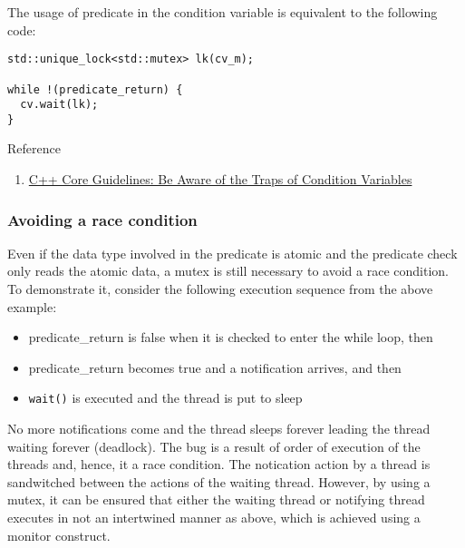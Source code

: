 \documentclass{scrartcl}
\begin{document}
The usage of predicate in the condition variable is equivalent to the following code:

\begin{verbatim}
std::unique_lock<std::mutex> lk(cv_m);

while !(predicate_return) {
  cv.wait(lk);
}
\end{verbatim}


Reference
\begin{enumerate}
\item \href{https://www.modernescpp.com/index.php/c-core-guidelines-be-aware-of-the-traps-of-condition-variables}{C++ Core Guidelines: Be Aware of the Traps of Condition Variables}
\end{enumerate}

\subsubsection{Avoiding a race condition}
Even if the data type involved in the predicate is atomic and the predicate check only reads the atomic data, a mutex is still necessary to avoid a race condition. To demonstrate it, consider the following execution sequence from the above example:
\begin{itemize}
    \item predicate\_return is false when it is checked to enter the while loop, then
    \item predicate\_return becomes true and a notification arrives, and then
    \item \texttt{wait()} is executed and the thread is put to sleep
\end{itemize}

No more notifications come and the thread sleeps forever leading the thread waiting forever (deadlock). The bug is a result of order of execution of the threads and, hence, it a race condition. The notication action by a thread is sandwitched between the actions of the waiting thread. However, by using a mutex, it can be ensured that either the waiting thread or notifying thread executes in not an intertwined manner as above, which is achieved using a monitor construct.

\end{document}
